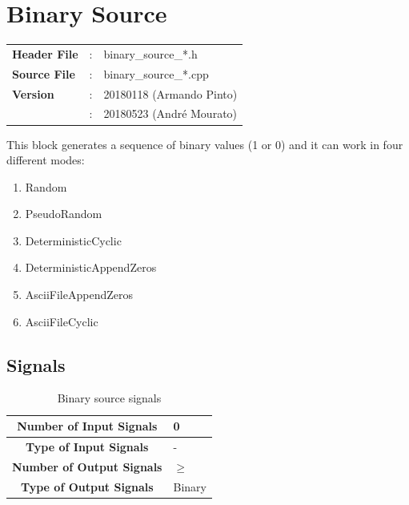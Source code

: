 \clearpage

\section{Binary Source}

\begin{tcolorbox}	
	\begin{tabular}{p{2.75cm} p{0.2cm} p{10.5cm}} 	
		\textbf{Header File}   &:& binary\_source\_*.h \\
		\textbf{Source File}   &:& binary\_source\_*.cpp \\
        \textbf{Version}       &:& 20180118 (Armando Pinto)\\
                               &:& 20180523 (Andr\'e Mourato)
	\end{tabular}
\end{tcolorbox}

\maketitle
This block generates a sequence of binary values (1 or 0) and it can work in four different modes:

\begin{multicols}{3}
\begin{enumerate}
	\item Random
	\item PseudoRandom
	\item DeterministicCyclic
	\item DeterministicAppendZeros
    \item AsciiFileAppendZeros
    \item AsciiFileCyclic
\end{enumerate}
\end{multicols}

\subsection*{Signals}

\begin{table}[h]
	\begin{tabular}{|c|l|}
		\hline
		\textbf{Number of Input Signals} & 0 \\ \hline
        \textbf{Type of Input Signals} & - \\ \hline
    	\textbf{Number of Output Signals} & $\geq $ \ \\ \hline
        \textbf{Type of Output Signals} & Binary \\ \hline
	\end{tabular}
	\caption{Binary source signals}
	\label{table:bin_sour_signals}
\end{table}

